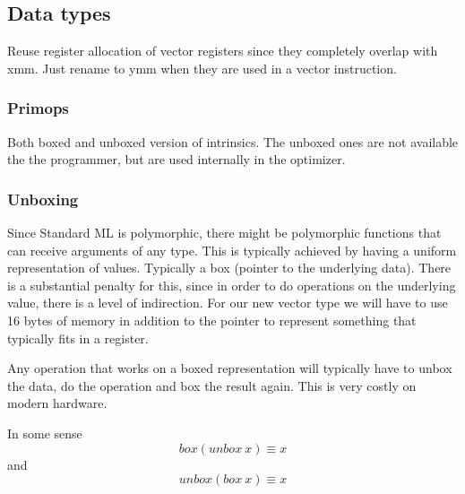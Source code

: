 \documentclass{article}
\begin{document}
\subsection{Data types}

Reuse register allocation of vector registers since they completely overlap with xmm. Just rename to ymm when they are used in a vector instruction.

\subsubsection{Primops}

Both boxed and unboxed version of intrinsics. The unboxed ones are not available the the programmer, but are used internally in the optimizer.

\subsubsection{Unboxing}

Since Standard ML is polymorphic, there might be polymorphic functions that can receive arguments of any type. This is typically achieved by having a uniform representation of values. Typically a box (pointer to the underlying data). There is a substantial penalty for this, since in order to do operations on the underlying value, there is a level of indirection. For our new vector type we will have to use 16 bytes of memory in addition to the pointer to represent something that typically fits in a register.

Any operation that works on a boxed representation will typically have to unbox the data, do the operation and box the result again. This is very costly on modern hardware.

In some sense
\[
    box (unbox\ x) \equiv x
\]
and
\[
    unbox (box\ x) \equiv x
\]



\end{document}
